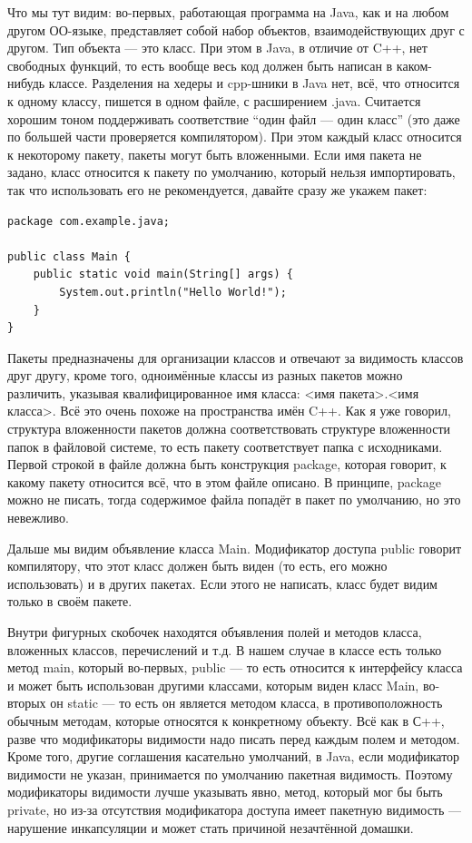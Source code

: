 \documentclass[a5paper]{article}
\begin{document}
Что мы тут видим: во-первых, работающая программа на Java, как и на любом другом ОО-языке, представляет собой набор объектов, взаимодействующих друг с другом. Тип объекта --- это класс. При этом в Java, в отличие от C++, нет свободных функций, то есть вообще весь код должен быть написан в каком-нибудь классе. Разделения на хедеры и cpp-шники в Java нет, всё, что относится к одному классу, пишется в одном файле, с расширением .java. Считается хорошим тоном поддерживать соответствие ``один файл --- один класс'' (это даже по большей части проверяется  компилятором). При этом каждый класс относится к некоторому пакету, пакеты могут быть вложенными. Если имя пакета не задано, класс относится к пакету по умолчанию, который нельзя импортировать, так что использовать его не рекомендуется, давайте сразу же укажем пакет:

\begin{verbatim}
package com.example.java;

public class Main {
    public static void main(String[] args) {
        System.out.println("Hello World!");
    }
}
\end{verbatim}

Пакеты предназначены для организации классов и отвечают за видимость классов друг другу, кроме того, одноимённые классы из разных пакетов можно различить, указывая квалифицированное имя класса: <имя пакета>.<имя класса>. Всё это очень похоже на пространства имён C++. Как я уже говорил, структура вложенности пакетов должна соответствовать структуре вложенности папок в файловой системе, то есть пакету соответствует папка с исходниками. Первой строкой в файле должна быть конструкция package, которая говорит, к какому пакету относится всё, что в этом файле описано. В принципе, package можно не писать, тогда содержимое файла попадёт в пакет по умолчанию, но это невежливо.

Дальше мы видим объявление класса Main. Модификатор доступа public говорит компилятору, что этот класс должен быть виден (то есть, его можно использовать) и в других пакетах. Если этого не написать, класс будет видим только в своём пакете.

Внутри фигурных скобочек находятся объявления полей и методов класса, вложенных классов, перечислений  и т.д. В нашем случае в классе есть только метод main, который во-первых, public --- то есть относится к интерфейсу класса и может быть использован другими классами, которым виден класс Main, во-вторых он static --- то есть он является методом класса, в противоположность обычным методам, которые относятся к конкретному объекту. Всё как в  С++, разве что модификаторы видимости надо писать перед каждым полем и методом. Кроме того, другие соглашения касательно умолчаний, в Java, если модификатор видимости не указан, принимается по умолчанию пакетная видимость. Поэтому модификаторы видимости лучше указывать явно, метод, который мог бы быть private, но из-за отсутствия модификатора доступа имеет пакетную видимость --- нарушение инкапсуляции и может стать причиной незачтённой домашки.
\end{document}
